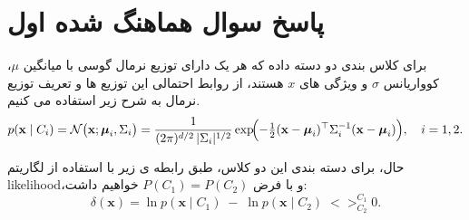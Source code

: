 \documentclass{article}
\begin{document}



\tableofcontents

\section{پاسخ سوال هماهنگ شده اول}
برای کلاس بندی دو دسته داده که هر یک دارای توزیع نرمال گوسی با میانگین $\mu$، کوواریانس $\sigma$ و ویژگی های $x$ هستند، از روابط احتمالی این توزیع ها و تعریف توزیع نرمال به شرح زیر استفاده می کنیم.
\begin{equation}
	p(\mathbf{x}\mid C_i)
	= \mathcal{N}\bigl(\mathbf{x};\boldsymbol\mu_i,\Sigma_i\bigr)
	= \frac{1}{(2\pi)^{d/2}\,\lvert\Sigma_i\rvert^{1/2}}
	\exp\!\Bigl(-\tfrac12(\mathbf{x}-\boldsymbol\mu_i)^\top\Sigma_i^{-1}(\mathbf{x}-\boldsymbol\mu_i)\Bigr),
	\quad i=1,2.
\end{equation}

حال، برای دسته بندی این دو کلاس، طبق رابطه ی زیر با استفاده از لگاریتم likelihood،و با فرض $P(C_1)=P(C_2)$ خواهیم داشت:
\begin{equation}
	  \delta(\mathbf{x})
	=\ln p(\mathbf{x}\mid C_1)\;-\;\ln p(\mathbf{x}\mid C_2)
	\;<>_{C_2}^{C_1}0.
\end{equation} 
\end{document}
